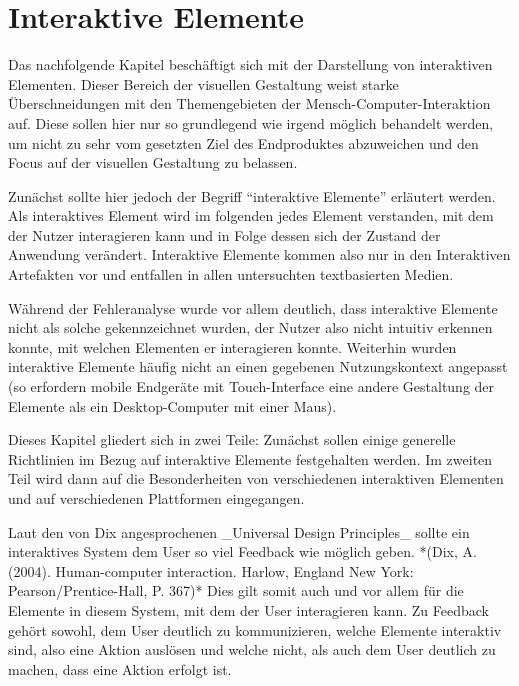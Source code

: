
\chapter{Interaktive Elemente} %

\label{Interaktive-Elemente} %



Das nachfolgende Kapitel beschäftigt sich mit der Darstellung von interaktiven Elementen. Dieser Bereich der visuellen Gestaltung weist starke Überschneidungen mit den Themengebieten der Mensch-Computer-Interaktion auf. Diese sollen hier nur so grundlegend wie irgend möglich behandelt werden, um nicht zu sehr vom gesetzten Ziel des Endproduktes abzuweichen und den Focus auf der visuellen Gestaltung zu belassen.

Zunächst sollte hier jedoch der Begriff “interaktive Elemente” erläutert werden. Als interaktives Element wird im folgenden jedes Element verstanden, mit dem der Nutzer interagieren kann und in Folge dessen sich der Zustand der Anwendung verändert. Interaktive Elemente kommen also nur in den Interaktiven Artefakten vor und entfallen in allen untersuchten textbasierten Medien.

Während der Fehleranalyse wurde vor allem deutlich, dass interaktive Elemente nicht als solche gekennzeichnet wurden, der Nutzer also nicht intuitiv erkennen konnte, mit welchen Elementen er interagieren konnte. Weiterhin wurden interaktive Elemente häufig nicht an einen gegebenen Nutzungskontext angepasst (so erfordern mobile Endgeräte mit Touch-Interface eine andere Gestaltung der Elemente als ein Desktop-Computer mit einer Maus).

Dieses Kapitel gliedert sich in zwei Teile: Zunächst sollen einige generelle Richtlinien im Bezug auf interaktive Elemente festgehalten werden. Im zweiten Teil wird dann auf die Besonderheiten von verschiedenen interaktiven Elementen und auf verschiedenen Plattformen eingegangen.

Laut den von Dix angesprochenen _Universal Design Principles_ sollte ein interaktives System dem User so viel Feedback wie möglich geben. *(Dix, A. (2004). Human-computer interaction. Harlow, England New York: Pearson/Prentice-Hall, P. 367)* Dies gilt somit auch und vor allem für die Elemente in diesem System, mit dem der User interagieren kann.
Zu Feedback gehört sowohl, dem User deutlich zu kommunizieren, welche Elemente interaktiv sind, also eine Aktion auslösen und welche nicht, als auch dem User deutlich zu machen, dass eine Aktion erfolgt ist.

